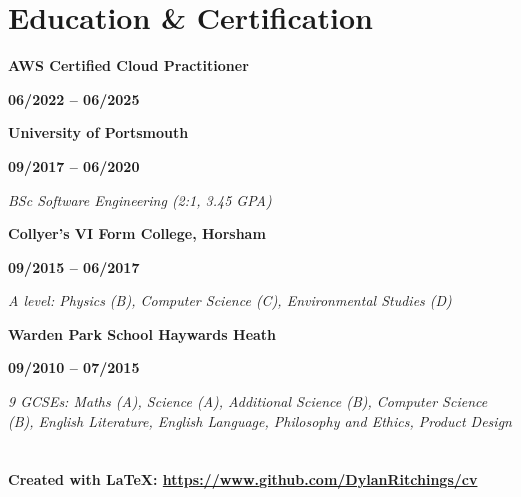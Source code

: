 \documentclass[12pt]{article}
\newcommand{\education}[3]{

  \noindent  \textbf{#1}
    \hfill 
    \parbox{9em}{%
    \centering\textbf{#2}} \par
    \vspace*{0.5em} 
     \noindent \textit{#3} \par
     \vspace*{1em}
\normalsize \par}
\begin{document}
\section*{Education \& Certification}

\education{AWS Certified Cloud Practitioner} {06/2022 -- 06/2025} {}
\education{University of Portsmouth} {09/2017 -- 06/2020} {BSc Software Engineering (2:1, 3.45 GPA)} 
\education{Collyer's VI Form College, Horsham} {09/2015 -- 06/2017} {A level: Physics (B), Computer Science (C), Environmental Studies (D)}
\education{Warden Park School Haywards Heath} {09/2010 -- 07/2015} {9 GCSEs: Maths (A), Science (A), Additional Science (B), Computer Science (B), English Literature, English Language, Philosophy and Ethics, Product Design} 

\section*{}
\paragraph {Created with \LaTeX: \url{https://www.github.com/DylanRitchings/cv}}
\end{document}
